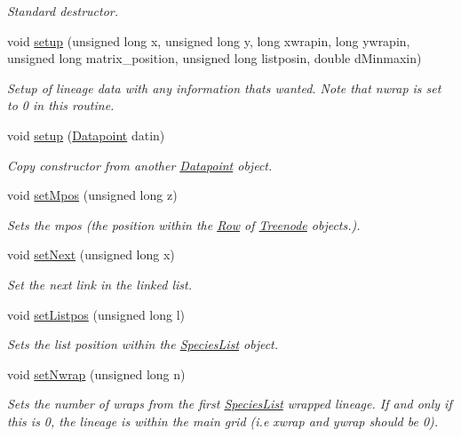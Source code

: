 \begin{DoxyCompactItemize}
\begin{DoxyCompactList}\small\item\em Standard destructor. \end{DoxyCompactList}\item 
void \hyperlink{class_datapoint_aa23a3fa39ff4ab4d953c6563463d1fc6}{setup} (unsigned long x, unsigned long y, long xwrapin, long ywrapin, unsigned long matrix\+\_\+position, unsigned long listposin, double d\+Minmaxin)
\begin{DoxyCompactList}\small\item\em Setup of lineage data with any information that\textquotesingle{}s wanted. Note that nwrap is set to 0 in this routine. \end{DoxyCompactList}\item 
void \hyperlink{class_datapoint_a83643d56367b2bbb7c258fb914425000}{setup} (\hyperlink{class_datapoint}{Datapoint} datin)
\begin{DoxyCompactList}\small\item\em Copy constructor from another \hyperlink{class_datapoint}{Datapoint} object. \end{DoxyCompactList}\item 
void \hyperlink{class_datapoint_a620aac6c81add9e842ca78005f04cf25}{set\+Mpos} (unsigned long z)
\begin{DoxyCompactList}\small\item\em Sets the mpos (the position within the \hyperlink{class_row}{Row} of \hyperlink{class_treenode}{Treenode} objects.). \end{DoxyCompactList}\item 
void \hyperlink{class_datapoint_a7a2e682e5a607ead9c42df83a85a2451}{set\+Next} (unsigned long x)
\begin{DoxyCompactList}\small\item\em Set the next link in the linked list. \end{DoxyCompactList}\item 
void \hyperlink{class_datapoint_adaadd5f47129e8983f898da35867d0d6}{set\+Listpos} (unsigned long l)
\begin{DoxyCompactList}\small\item\em Sets the list position within the \hyperlink{class_species_list}{Species\+List} object. \end{DoxyCompactList}\item 
void \hyperlink{class_datapoint_a5fc8711272b57d2d219464cb10405fc4}{set\+Nwrap} (unsigned long n)
\begin{DoxyCompactList}\small\item\em Sets the number of wraps from the first \hyperlink{class_species_list}{Species\+List} wrapped lineage. If and only if this is 0, the lineage is within the main grid (i.\+e xwrap and ywrap should be 0). \end{DoxyCompactList}\item 

\end{DoxyCompactItemize}
